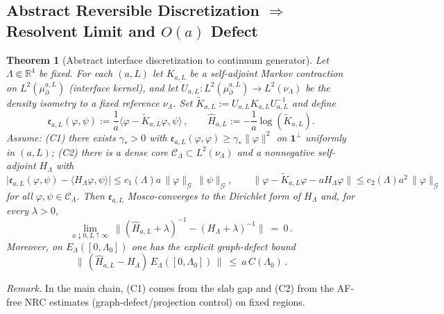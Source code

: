\documentclass[11pt]{amsart}
\theoremstyle{plain}
\newtheorem{theorem}{Theorem}[section]
\theoremstyle{definition}
\theoremstyle{remark}
\renewcommand{\tfrac}[2]{\textstyle\frac{#1}{#2}}
\begin{document}
\subsection*{Abstract Reversible Discretization $\Rightarrow$ Resolvent Limit and $O(a)$ Defect}
\begin{theorem}[Abstract interface discretization to continuum generator]\label{thm:abstract-discretization}
Let $\Lambda\Subset\mathbb R^4$ be fixed. For each $(a,L)$ let $K_{a,L}$ be a self-adjoint Markov contraction on $L^2(\mu_{\partial}^{a,L})$ (interface kernel), and let $U_{a,L}:L^2(\mu_{\partial}^{a,L})\to L^2(\nu_\Lambda)$ be the density isometry to a fixed reference $\nu_\Lambda$. Set $\widetilde K_{a,L}:=U_{a,L}K_{a,L}U_{a,L}^{-1}$ and define
\[
  \mathfrak e_{a,L}(\varphi,\psi):=\tfrac{1}{a}\langle \varphi-\widetilde K_{a,L}\varphi,\psi\rangle\,,\qquad \widehat H_{a,L}:=-\tfrac{1}{a}\log(\widetilde K_{a,L}).
\]
Assume: (C1) there exists $\gamma_*>0$ with $\mathfrak e_{a,L}(\varphi,\varphi)\ge \gamma_*\|\varphi\|^2$ on $\mathbf 1^\perp$ uniformly in $(a,L)$; (C2) there is a dense core $\mathcal C_\Lambda\subset L^2(\nu_\Lambda)$ and a nonnegative self-adjoint $H_\Lambda$ with
\[
  \big|\mathfrak e_{a,L}(\varphi,\psi)-\langle H_\Lambda\varphi,\psi\rangle\big|\le c_1(\Lambda) a\,\|\varphi\|_{\mathcal G}\,\|\psi\|_{\mathcal G},\qquad
  \|\varphi-\widetilde K_{a,L}\varphi-a H_\Lambda\varphi\|\le c_2(\Lambda) a^2\,\|\varphi\|_{\mathcal G}
\]
for all $\varphi,\psi\in\mathcal C_\Lambda$. Then $\mathfrak e_{a,L}$ Mosco-converges to the Dirichlet form of $H_\Lambda$ and, for every $\lambda>0$,
\[
  \lim_{a\downarrow 0,L\uparrow\infty}\ \big\|(\widehat H_{a,L}+\lambda)^{-1}-(H_\Lambda+\lambda)^{-1}\big\|\ =\ 0\,.
\]
Moreover, on $E_\Lambda([0,\Lambda_0])$ one has the explicit graph-defect bound
\[
  \|\,(\widehat H_{a,L}-H_\Lambda)\,E_\Lambda([0,\Lambda_0])\,\|\ \le\ a\,C(\Lambda_0)\,.
\]
\end{theorem}
\noindent\emph{Remark.} In the main chain, (C1) comes from the slab gap and (C2) from the AF-free NRC estimates (graph-defect/projection control) on fixed regions.
\end{document}

